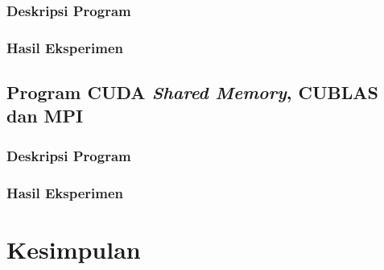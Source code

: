 \todo{}

\subsubsection{Deskripsi Program}

\todo{}

\subsubsection{Hasil Eksperimen}

\todo{}

\subsection{Program CUDA \textit{Shared Memory}, CUBLAS dan MPI} 

\todo{}

\subsubsection{Deskripsi Program}

\todo{}

\subsubsection{Hasil Eksperimen}

\todo{}


\section{Kesimpulan}

\todo{}
